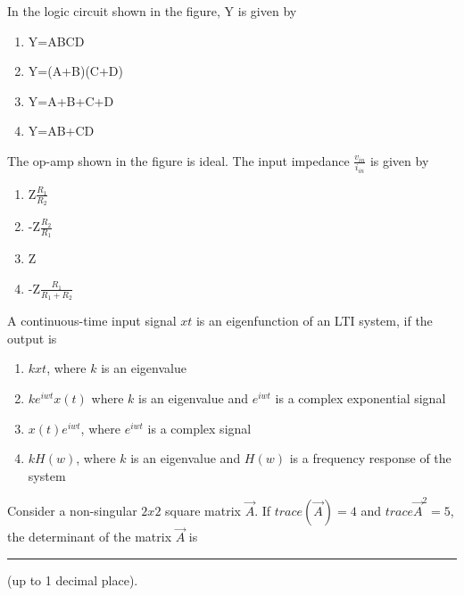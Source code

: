 \iffalse
\chapter{2018}
\author{AI24BTECH11012}
\section{ee}
\fi

    \item In the logic circuit shown in the figure, Y is given by
    
    \begin{enumerate}
    \item Y=ABCD
    \item Y=(A+B)(C+D)
    \item Y=A+B+C+D
    \item Y=AB+CD
    \end{enumerate}
    
    \item The op-amp shown in the figure is ideal. The input impedance $\frac{v_{in}}{i_{in}}$ is given by
    
    \begin{enumerate}
    \item Z$\frac{R_1}{R_2}$
    \item -Z$\frac{R_2}{R_1}$
    \item Z
    \item -Z$\frac{R_1}{R_1+R_2}$
    \end{enumerate}
    
    \item A continuous-time input signal $x{t}$ is an eigenfunction of an LTI system, if the output is
    \begin{enumerate}
    \item $kx{t}$, where $k$ is an eigenvalue
    \item $ke^{iwt}x(t)$ where $k$ is an eigenvalue and $e^{iwt}$ is a complex exponential signal
    \item $x(t)e^{iwt}$, where $e^{iwt}$ is a complex signal
    \item $kH(w)$, where $k$ is an eigenvalue and $H(w)$ is a frequency response of the system
    \end{enumerate}
    
    \item Consider a non-singular $2x2$ square matrix $\vec{A}$. If $trace(\vec{A})=4$ and $trace{\vec{A}^2}=5$, the determinant of the matrix $\vec{A}$ is \rule{2.5cm}{0.4pt}(up to 1 decimal place).
    
